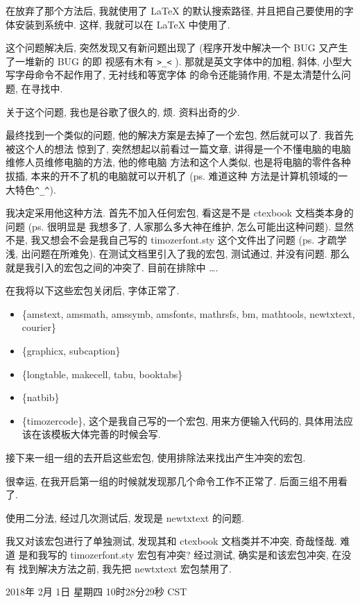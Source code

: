 \documentclass{cugrep}
\begin{document}
在放弃了那个方法后, 我就使用了 \LaTeX{} 的默认搜索路径, 并且把自己要使用的字体安装到系统中.
这样, 我就可以在 \LaTeX{} 中使用了. 

这个问题解决后, 突然发现又有新问题出现了 (程序开发中解决一个 BUG 又产生了一堆新的 BUG 的即
视感有木有 \verb|>_<| ). 那就是英文字体中的加粗, 斜体, 小型大写字母命令不起作用了, 无衬线和等宽字体
的命令还能骑作用, 不是太清楚什么问题, 在寻找中.

关于这个问题, 我也是谷歌了很久的, 烦. 资料出奇的少.

最终找到一个类似的问题, 他的解决方案是去掉了一个宏包, 然后就可以了. 我首先被这个人的想法
惊到了, 突然想起以前看过一篇文章, 讲得是一个不懂电脑的电脑维修人员维修电脑的方法, 他的修电脑
方法和这个人类似, 也是将电脑的零件各种拔插, 本来的开不了机的电脑就可以开机了 (ps. 难道这种
方法是计算机领域的一大特色\verb|^_^|).

我决定采用他这种方法. 首先不加入任何宏包, 看这是不是 ctexbook 文档类本身的问题 (ps. 很明显是
我想多了, 人家那么多大神在维护, 怎么可能出这种问题). 显然不是, 我又想会不会是我自己写的 
timozerfont.sty 这个文件出了问题 (ps. 才疏学浅, 出问题在所难免). 在测试文档里引入了我的宏包, 
测试通过, 并没有问题. 那么就是我引入的宏包之间的冲突了. 目前在排除中 \ldots .

在我将以下这些宏包关闭后, 字体正常了.

\begin{itemize}
    \item \{amstext, amsmath, amssymb, amsfonts, mathrsfs, bm, mathtools, newtxtext, courier\}
    \item \{graphicx, subcaption\}
    \item \{longtable, makecell, tabu, booktabs\}
    \item \{natbib\}
    \item \{timozercode\}, 这个是我自己写的一个宏包, 用来方便输入代码的, 具体用法应该在该模板大体完善的时候会写.
\end{itemize}


接下来一组一组的去开启这些宏包, 使用排除法来找出产生冲突的宏包. 

很幸运, 在我开启第一组的时候就发现那几个命令工作不正常了. 后面三组不用看了.

使用二分法, 经过几次测试后, 发现是 newtxtext 的问题. 

我又对该宏包进行了单独测试, 发现其和 ctexbook 文档类并不冲突, 奇哉怪哉. 难道
是和我写的 timozerfont.sty 宏包有冲突? 经过测试, 确实是和该宏包冲突, 在没有
找到解决方法之前, 我先把 newtxtext 宏包禁用了. 

2018年 2月 1日 星期四 10时28分29秒 CST
\end{document}
